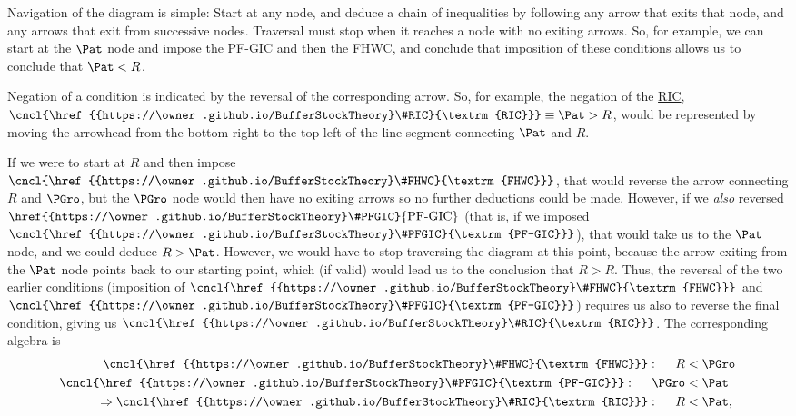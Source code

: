 \documentclass[\econtexRoot/BufferStockTheory]{subfiles}
\newcommand{\BSTlinkTo}{https://\owner.github.io/BufferStockTheory}
\renewcommand{\FHWC}{\href{{\BSTlinkTo}FHWC}{\textrm{FHWC}}}
\renewcommand{\FHWC}{\href{{\BSTlinkTo}\#FHWC}{\textrm{FHWC}}}
\renewcommand{\PFGIC}{\href{{\BSTlinkTo}\#PFGIC}{\textrm{PF-GIC}}}
\renewcommand{\RIC}{\href{{\BSTlinkTo}\#RIC}{\textrm{RIC}}}
\begin{document}
Navigation of the diagram is simple: Start at any node, and deduce a chain of inequalities by following any arrow that exits that node, and any arrows that exit from successive nodes.  Traversal must stop when it reaches a node with no exiting arrows.  So, for example, we can start at the $\Pat$ node and impose the {\PFGIC} and then the {\FHWC}, and conclude that imposition of these conditions allows us to conclude that $\Pat < {R}$.

Negation of a condition is indicated by the reversal of the corresponding arrow.  So, for example, the negation of the {\RIC},  $\cncl{\RIC} \equiv \Pat > {R}$, would be represented by moving the arrowhead from the bottom right to the top left of the line segment connecting {$\Pat$} and ${R}$.

If we were to start at ${R}$ and then impose $\cncl{\FHWC}$, that would reverse the arrow connecting ${R}$ and $\PGro$, but the $\PGro$ node would then have no exiting arrows so no further deductions could be made.  However, if we \textit{also} reversed $\PFGIC$ (that is, if we imposed $\cncl{\PFGIC}$), that would take us to the $\Pat$ node, and we could deduce ${R} > \Pat$.  However, we would have to stop traversing the diagram at this point, because the arrow exiting from the $\Pat$ node points back to our starting point, which (if valid) would lead us to the conclusion that ${R} > {R}$.  Thus, the reversal of the two earlier conditions (imposition of $\cncl{\FHWC}$ and $\cncl{\PFGIC}$) requires us also to reverse the final condition, giving us $\cncl{\RIC}$.  The corresponding algebra is
\begin{equation}\begin{gathered}\begin{aligned}
  \cncl{\FHWC}:~~~~  {R} & < \PGro \notag  
  \\ \cncl{\PFGIC}:~~~~ \PGro & < \Pat %
                                \label{eq:cnclRIC}
  \\ \Rightarrow \cncl{\RIC}:~~~~{R} & < \Pat \notag,
\end{aligned}\end{gathered}\end{equation}

\end{document}
